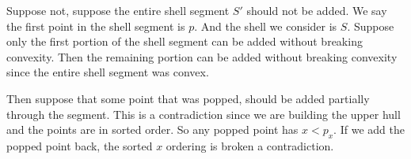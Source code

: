 \documentclass[11pt]{article}
\begin{document}
Suppose not, suppose the entire shell segment $S'$ should not be added. We say the first point in the shell segment is $p$.
And the shell we consider is $S$. Suppose only the first portion of the shell segment can be added without breaking convexity.
Then the remaining portion can be added without breaking convexity since the entire shell segment was convex. 

Then suppose that some point that was popped, should be added partially through the segment. 
This is a contradiction since we are building the upper hull and the points are in sorted order. So any popped point has
$x < p_x$. If we add the popped point back, the sorted $x$ ordering is broken a contradiction.
\end{document}
